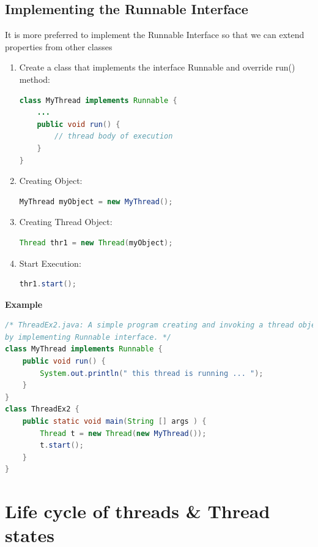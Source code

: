 \documentclass[12pt, a4paper]{book}
\begin{document}
\subsection{Implementing the Runnable Interface}
It is more preferred to implement the Runnable Interface so that we can extend properties from other classes
\begin{enumerate}
    \item Create a class that implements the interface Runnable and override run() method:
          \begin{lstlisting}[language=java]
class MyThread implements Runnable {
    ...
    public void run() {
        // thread body of execution
    }
}
    \end{lstlisting}
    \item Creating Object:
          \begin{lstlisting}[language=java]
        MyThread myObject = new MyThread();
    \end{lstlisting}
    \item Creating Thread Object:
          \begin{lstlisting}[language=java]
        Thread thr1 = new Thread(myObject);
    \end{lstlisting}
    \item Start Execution:
          \begin{lstlisting}[language=java]
        thr1.start();
    \end{lstlisting}
\end{enumerate}
\textbf{Example} \\
\begin{lstlisting}[language=java]
/* ThreadEx2.java: A simple program creating and invoking a thread object
by implementing Runnable interface. */
class MyThread implements Runnable {
    public void run() {
        System.out.println(" this thread is running ... ");
    }
}
class ThreadEx2 {
    public static void main(String [] args ) {
        Thread t = new Thread(new MyThread());
        t.start();
    }
}
\end{lstlisting}
\section{Life cycle of threads \& Thread states}
\end{document}
